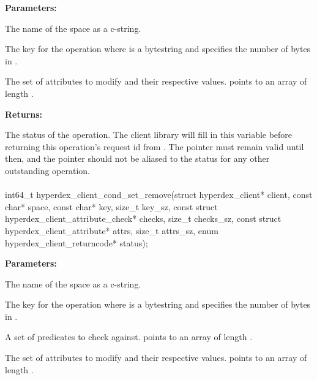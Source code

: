 \noindent\textbf{Parameters:}
\begin{description}[labelindent=\widthof{{\code{attrs}, \code{attrs\_sz}}},leftmargin=*,noitemsep,nolistsep,align=right]
\item[\code{space}] The name of the space as a c-string.
\item[\code{key}, \code{key\_sz}] The key for the operation where  is a bytestring and  specifies the number of bytes in .
\item[\code{attrs}, \code{attrs\_sz}] The set of attributes to modify and their respective values.   points to an array of length .
\end{description}

\noindent\textbf{Returns:}
\begin{description}[labelindent=\widthof{{\code{status}}},leftmargin=*,noitemsep,nolistsep,align=right]
\item[\code{status}] The status of the operation.  The client library will fill in this variable before returning this operation's request id from .  The pointer must remain valid until then, and the pointer should not be aliased to the status for any other outstanding operation.
\end{description}

\paragraph{}
\label{api:c:cond_set_remove}
\begin{ccode}
int64_t hyperdex_client_cond_set_remove(struct hyperdex_client* client,
                const char* space,
                const char* key, size_t key_sz,
                const struct hyperdex_client_attribute_check* checks, size_t checks_sz,
                const struct hyperdex_client_attribute* attrs, size_t attrs_sz,
                enum hyperdex_client_returncode* status);
\end{ccode}
\funcdesc 

\noindent\textbf{Parameters:}
\begin{description}[labelindent=\widthof{{\code{checks}, \code{checks\_sz}}},leftmargin=*,noitemsep,nolistsep,align=right]
\item[\code{space}] The name of the space as a c-string.
\item[\code{key}, \code{key\_sz}] The key for the operation where  is a bytestring and  specifies the number of bytes in .
\item[\code{checks}, \code{checks\_sz}] A set of predicates to check against.   points to an array of length .
\item[\code{attrs}, \code{attrs\_sz}] The set of attributes to modify and their respective values.   points to an array of length .
\end{description}

